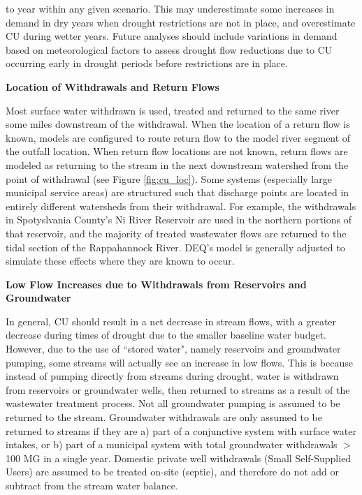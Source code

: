\begin{multicols}{2}
\noindent to year within any given scenario. This may underestimate some increases in demand in dry years when drought restrictions are not in place, and overestimate CU during wetter years.  Future analyses should include variations in demand based on meteorological factors to assess drought flow reductions due to CU occurring early in drought periods before restrictions are in place.\bigskip

\noindent \textbf{Location of Withdrawals and Return Flows}\smallskip
\label{sec:cu_return_loc}

\noindent Most surface water withdrawn is used, treated and returned to the same river some miles downstream of the withdrawal.  When the location of a return flow is known, models are configured to route return flow to the model river segment of the outfall location.  When return flow locations are not known, return flows are modeled as returning to the stream in the next downstream watershed from the point of withdrawal (see Figure \ref{fig:cu_loc}). Some systems (especially large municipal service areas) are structured such that discharge points are located in entirely different watersheds from their withdrawal. For example, the withdrawals in Spotyslvania County's Ni River Reservoir are used in the northern portions of that reservoir, and the majority of treated wastewater flows are returned to the tidal section of the Rappahannock River.  DEQ's model is generally adjusted to simulate these effects where they are known to occur.\bigskip


\noindent \textbf{Low Flow Increases due to Withdrawals from Reservoirs and Groundwater}\smallskip
\label{sec:cu_lowflows}

\noindent In general, CU should result in a net decrease in stream flows, with a greater decrease during times of drought due to the smaller baseline water budget.  However, due to the use of ``stored water", namely reservoirs and groundwater pumping, some streams will actually see an increase in low flows. This is because instead of pumping directly from streams during drought, water is withdrawn from reservoirs or groundwater wells, then returned to streams as a result of the wastewater treatment process.  Not all groundwater pumping is assumed to be returned to the stream.  Groundwater withdrawals are only assumed to be returned to streams if they are a) part of a conjunctive system with surface water intakes, or b) part of a municipal system with total groundwater withdrawals $>$ 100 MG in a single year.  Domestic private well withdrawals (Small Self-Supplied Users) are assumed to be treated on-site (septic), and therefore do not add or subtract from the stream water balance.
\end{multicols}



